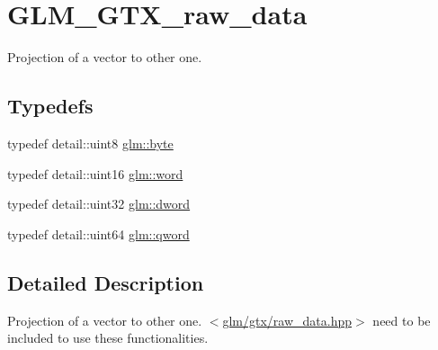 \hypertarget{group__gtx__raw__data}{\section{G\-L\-M\-\_\-\-G\-T\-X\-\_\-raw\-\_\-data}
\label{group__gtx__raw__data}
}


Projection of a vector to other one.  


\subsection*{Typedefs}
\begin{DoxyCompactItemize}
\item 
typedef detail\-::uint8 \hyperlink{group__gtx__raw__data_gacd7fe1f2ad60a57f7d7ad4f1e6836efd}{glm\-::byte}
\item 
typedef detail\-::uint16 \hyperlink{group__gtx__raw__data_ga5617a479d471021b5c773c5e969ba46d}{glm\-::word}
\item 
typedef detail\-::uint32 \hyperlink{group__gtx__raw__data_ga1fc2589df6d44e923cd1820cf14805cf}{glm\-::dword}
\item 
typedef detail\-::uint64 \hyperlink{group__gtx__raw__data_ga32447af289e879589883c9b7e3be1246}{glm\-::qword}
\end{DoxyCompactItemize}


\subsection{Detailed Description}
Projection of a vector to other one. $<$\hyperlink{raw__data_8hpp}{glm/gtx/raw\-\_\-data.\-hpp}$>$ need to be included to use these functionalities. 


